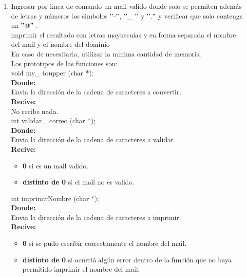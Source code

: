 \documentclass[12pt]{article} %
\begin{document}
\begin{enumerate}
\item Ingresar por linea de comando un mail valido donde solo se permiten además de letras y números los simbolos $"${\color{red}-}$"$, $"${\color{red}\_ }$"$ y $"${\color{red}.}$"$    y verificar que solo contenga un $"${\color{red}@}$"$ .\\
imprimir el resultado con letras mayusculas y en forma separada el nombre del mail y el nombre del dominio\\ 
En caso de necesitarla, utilizar la minima cantidad de memoria.\\
Los prototipos de las funciones son: \\

{\color{blue}void} my\_ toupper ({\color{blue}char} *);\\
{\bf Donde:}\\
Envia la dirección de la cadena de caracteres a convertir.\\
{\bf Recive:}\\
No recibe nada.\\

{\color{blue}int} validar\_ correo ({\color{blue}char} *);\\
{\bf Donde:}\\
Envia la dirección de la cadena de caracteres a validar.\\
{\bf Recive:}
	\begin{itemize}
	\item {\bf 0} si es un mail valido.
	\item {\bf distinto de 0} si el mail no es valido. 
	\end{itemize}

{\color{blue}int} imprimirNombre ({\color{blue}char} *);\\
{\bf Donde:}\\
Envia la dirección de la cadena de caracteres a imprimir.\\
{\bf Recive:}
	\begin{itemize}
	\item {\bf 0} si se pudo escribir correctamente el nombre del mail.
	\item {\bf distinto de 0} si ocurrió algún error dentro de la función que no haya permitido imprimir el nombre del mail. 
	\end{itemize}


\end{enumerate}
\end{document}
